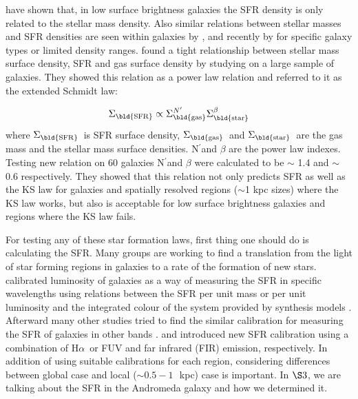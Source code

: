 \documentclass[useAMS,usenatbib]{mn2e}
\newcommand \kpc        {\,{\rm kpc}}
\newcommand \sigmagas    {$\Sigma_{\rm \bld {gas }}$\ }
\newcommand \eqsigmagas    {\Sigma_{\rm \bld {gas }}}
\newcommand \sigmasfr     {$\Sigma_{\rm \bld {SFR }}$\ }
\newcommand \eqsigmasfr     {\Sigma_{\rm \bld {SFR }}}
\newcommand \sigmastar    {$\Sigma_{\rm \bld {star }}$\ }
\newcommand \eqsigmastar    {\Sigma_{\rm \bld {star }}}
\newcommand \halpha    {H$\alpha $\ }
\newcommand \nprime {N$^\prime$}
\newcommand \eqnprime {N^\prime}
\begin{document}
\cite{Hunter98} have shown that, in low surface brightness galaxies the SFR density is only related to the stellar mass density. Also similar relations between stellar masses and SFR densities are seen within galaxies by \cite{Ryder94}, \cite{Hunter04} and recently by \cite{Leroy08} for specific galaxy types or limited density ranges. \cite{Shi11} found a tight relationship between stellar mass surface density, SFR and gas surface density by studying on a large sample of galaxies. They showed this relation as a power law relation and referred to it as the extended Schmidt law:

\begin{equation}
\label{equ:es_org}
\eqsigmasfr \propto \eqsigmagas^{\eqnprime} \eqsigmastar^{\beta}
\end{equation}
where \sigmasfr is SFR surface density, \sigmagas and \sigmastar are the gas mass and the stellar mass surface densities. \nprime and $\beta$ are the power law indexes. Testing new relation on 60 galaxies \nprime and $\beta$ were calculated to be $\sim$ 1.4 and $\sim$ 0.6 respectively. They showed that this relation not only predicts SFR as well as the KS law for galaxies and spatially resolved regions ($\sim$1 kpc sizes) where the KS law works, but also is acceptable for low surface brightness galaxies and regions where the KS law fails.

For testing any of these star formation laws, first thing one should do is calculating the SFR. Many groups are working to find a translation from the light of star forming regions in galaxies to a rate of the formation of new stars. \cite{Kennicutt98b} calibrated luminosity of galaxies as a way of measuring the SFR in specific wavelengths using relations between the SFR per unit mass or per unit luminosity and the integrated colour of the system provided by synthesis models  \citep[e.g.,][]{Bruzual93}. Afterward many other studies tried to find the similar calibration for measuring the SFR of galaxies in other bands \citep[e.g.,][]{Kennicutt12, Calzetti12, Zhu08, Kennicutt09, Boquien10, Boquien11, Hao11}. \cite{Kennicutt09} and \cite{Hao11} introduced new SFR calibration using a combination of \halpha or FUV and far infrared (FIR) emission, respectively. In addition of using suitable calibrations for each region, considering differences between global case and local ($\sim 0.5-1$~\kpc) case is important. In $\S3$, we are talking about the SFR in the Andromeda galaxy and how we determined it.
\end{document}
